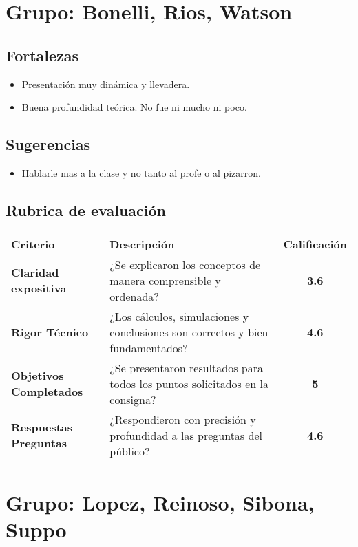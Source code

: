\documentclass[]{informeutn}
\begin{document}
    \chapter{Grupo: Bonelli, Rios, Watson}
      \section{Fortalezas}
        \begin{itemize}
            \item Presentación muy dinámica y llevadera.
            \item Buena profundidad teórica. No fue ni mucho ni poco.
        \end{itemize}
      \section{Sugerencias}
        \begin{itemize}
            \item Hablarle mas a la clase y no tanto al profe o al pizarron.
        \end{itemize}
      \section{Rubrica de evaluación}
        \begin{table}[!ht]
          \centering
          \begin{tabular}{|p{4.5cm}|p{7.5cm}|c|}
            \hline
            \textbf{Criterio} & \textbf{Descripción} & \textbf{Calificación} \\ \hline
            \textbf{Claridad expositiva} & ¿Se explicaron los conceptos de manera comprensible y ordenada? & \textbf{3.6} \\ \hline
            \textbf{Rigor Técnico} & ¿Los cálculos, simulaciones y conclusiones son correctos y bien fundamentados? & \textbf{4.6} \\ \hline
            \textbf{Objetivos Completados} & ¿Se presentaron resultados para todos los puntos solicitados en la consigna? & \textbf{5} \\ \hline
            \textbf{Respuestas Preguntas} & ¿Respondieron con precisión y profundidad a las preguntas del público? & \textbf{4.6} \\ \hline
          \end{tabular}
        \end{table}

    \chapter{Grupo: Lopez, Reinoso, Sibona, Suppo}
\end{document}
